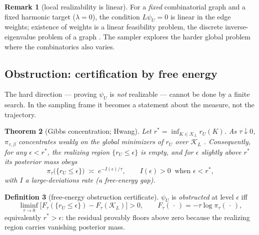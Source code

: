 \documentclass[11pt]{article}
\newcommand{\KK}{\mathcal{K}}
\theoremstyle{definition}
\newtheorem{definition}{Definition}[section]
\newtheorem{remark}[definition]{Remark}
\theoremstyle{plain}
\newtheorem{theorem}[definition]{Theorem}
\begin{document}
\begin{remark}[local realizability is linear]
For a \emph{fixed} combinatorial graph and a fixed harmonic target ($\lambda=0$), the
condition $L\psi_U=0$ is linear in the edge weights; existence of weights is a linear
feasibility problem, the discrete inverse-eigenvalue problem of a graph
\cite{fallat2024}. The sampler explores the harder global problem where the combinatorics
also varies.
\end{remark}

\subsection{Obstruction: certification by free energy}

The hard direction --- proving $\psi_U$ is \emph{not} realizable --- cannot be done by a
finite search. In the sampling frame it becomes a statement about the measure, not the
trajectory.

\begin{theorem}[Gibbs concentration; Hwang]
\label{thm:hwang}
Let $r^{*}=\inf_{K\in\KK_L} r_U(K)$. As $\tau\downarrow 0$, $\pi_{\tau,\beta}$ concentrates
weakly on the global minimizers of $r_U$ over $\KK_L$ \cite{hwang1980}. Consequently, for
any $\epsilon<r^{*}$, the realizing region $\{r_U\le\epsilon\}$ is empty, and for
$\epsilon$ slightly above $r^{*}$ its posterior mass obeys
\begin{equation}
\pi_{\tau}\big(\{r_U\le\epsilon\}\big)\;\asymp\;e^{-I(\epsilon)/\tau},
\qquad I(\epsilon)>0 \ \text{ when } \epsilon<r^{*},
\end{equation}
with $I$ a large-deviations rate (a free-energy gap).
\end{theorem}

\begin{definition}[free-energy obstruction certificate]
$\psi_U$ is \emph{obstructed} at level $\epsilon$ iff
\begin{equation}
\liminf_{\tau\to0}\Big[F_\tau(\{r_U\le\epsilon\})-F_\tau(\KK_L)\Big]>0,
\qquad F_\tau(\,\cdot\,)=-\tau\log\pi_\tau(\,\cdot\,),
\end{equation}
equivalently $r^{*}>\epsilon$: the residual provably floors above zero because the
realizing region carries vanishing posterior mass.
\end{definition}
\end{document}
